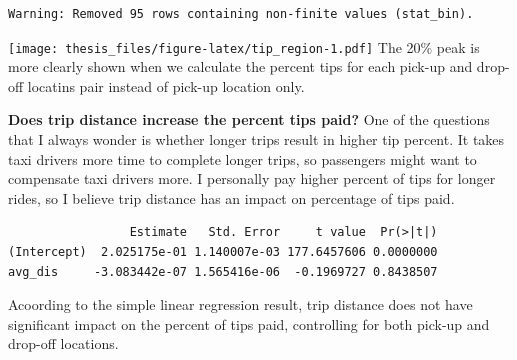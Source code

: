 \documentclass[12pt,twoside]{reedthesis}
\newenvironment{Shaded}{\begin{snugshade}}{\end{snugshade}}
\newcommand{\KeywordTok}[1]{\textcolor[rgb]{0.13,0.29,0.53}{\textbf{#1}}}
\newcommand{\DataTypeTok}[1]{\textcolor[rgb]{0.13,0.29,0.53}{#1}}
\newcommand{\DecValTok}[1]{\textcolor[rgb]{0.00,0.00,0.81}{#1}}
\newcommand{\FloatTok}[1]{\textcolor[rgb]{0.00,0.00,0.81}{#1}}
\newcommand{\StringTok}[1]{\textcolor[rgb]{0.31,0.60,0.02}{#1}}
\newcommand{\CommentTok}[1]{\textcolor[rgb]{0.56,0.35,0.01}{\textit{#1}}}
\newcommand{\OperatorTok}[1]{\textcolor[rgb]{0.81,0.36,0.00}{\textbf{#1}}}
\newcommand{\NormalTok}[1]{#1}
\theoremstyle{definition}
\theoremstyle{definition}
\theoremstyle{definition}
\theoremstyle{remark}
\begin{document}
\begin{Shaded}
\end{Shaded}
\begin{verbatim}
Warning: Removed 95 rows containing non-finite values (stat_bin).
\end{verbatim}
\texttt{[image: thesis\_files/figure-latex/tip\_region-1.pdf]} The 20\%
peak is more clearly shown when we calculate the percent tips for each
pick-up and drop-off locatins pair instead of pick-up location only.

\textbf{Does trip distance increase the percent tips paid?} One of the
questions that I always wonder is whether longer trips result in higher
tip percent. It takes taxi drivers more time to complete longer trips,
so passengers might want to compensate taxi drivers more. I personally
pay higher percent of tips for longer rides, so I believe trip distance
has an impact on percentage of tips paid.
\begin{Shaded}
\end{Shaded}
\begin{verbatim}
                 Estimate   Std. Error     t value  Pr(>|t|)
(Intercept)  2.025175e-01 1.140007e-03 177.6457606 0.0000000
avg_dis     -3.083442e-07 1.565416e-06  -0.1969727 0.8438507
\end{verbatim}
Acoording to the simple linear regression result, trip distance does not
have significant impact on the percent of tips paid, controlling for
both pick-up and drop-off locations.
\end{document}
